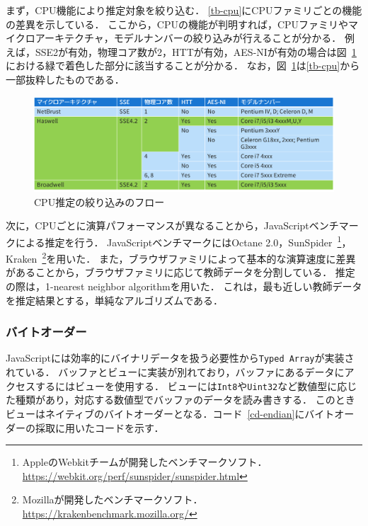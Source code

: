 まず，CPU機能により推定対象を絞り込む．
\ref{tb-cpu}にCPUファミリごとの機能の差異を示している．
ここから，CPUの機能が判明すれば，CPUファミリやマイクロアーキテクチャ，モデルナンバーの絞り込みが行えることが分かる．
例えば，SSE2が有効，物理コア数が2，HTTが有効，AES-NIが有効の場合は図~\ref{fig-cpu_est}における緑で着色した部分に該当することが分かる．
なお，図~\ref{fig-cpu_est}は\ref{tb-cpu}から一部抜粋したものである．

\begin{figure}[H]
	\centering
    \includegraphics[width=\textwidth,pagebox=artbox]{fig/cpu_est.png}
    \caption{CPU推定の絞り込みのフロー}
    \label{fig-cpu_est}
\end{figure}

次に，CPUごとに演算パフォーマンスが異なることから，JavaScriptベンチマークによる推定を行う．
JavaScriptベンチマークにはOctane 2.0，SunSpider~\footnote{AppleのWebkitチームが開発したベンチマークソフト．\url{https://webkit.org/perf/sunspider/sunspider.html}}，Kraken~\footnote{Mozillaが開発したベンチマークソフト．\url{https://krakenbenchmark.mozilla.org/}}を用いた．
また，ブラウザファミリによって基本的な演算速度に差異があることから，ブラウザファミリに応じて教師データを分割している．
推定の際は，1-nearest neighbor algorithmを用いた．
これは，最も近しい教師データを推定結果とする，単純なアルゴリズムである．

\subsubsection{バイトオーダー}
JavaScriptには効率的にバイナリデータを扱う必要性から\texttt{Typed Array}が実装されている．
バッファとビューに実装が別れており，バッファにあるデータにアクセスするにはビューを使用する．
ビューには\texttt{Int8}や\texttt{Uint32}など数値型に応じた種類があり，対応する数値型でバッファのデータを読み書きする．
このときビューはネイティブのバイトオーダーとなる．コード~\ref{cd-endian}にバイトオーダーの採取に用いたコードを示す．



